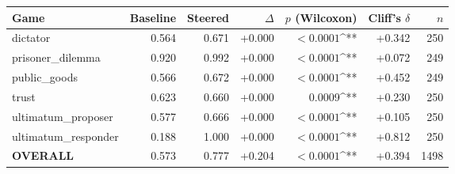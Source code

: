 \begin{tabular}{lrrrrrr}
\toprule
Game & Baseline & Steered & $\Delta$ & $p$ (Wilcoxon) & Cliff's $\delta$ & $n$ \\
\midrule
dictator & 0.564 & 0.671 & +0.000 & $<0.0001$^{**} & +0.342 & 250 \\
prisoner_dilemma & 0.920 & 0.992 & +0.000 & $<0.0001$^{**} & +0.072 & 249 \\
public_goods & 0.566 & 0.672 & +0.000 & $<0.0001$^{**} & +0.452 & 249 \\
trust & 0.623 & 0.660 & +0.000 & 0.0009^{**} & +0.230 & 250 \\
ultimatum_proposer & 0.577 & 0.666 & +0.000 & $<0.0001$^{**} & +0.105 & 250 \\
ultimatum_responder & 0.188 & 1.000 & +0.000 & $<0.0001$^{**} & +0.812 & 250 \\
\textbf{OVERALL} & 0.573 & 0.777 & +0.204 & $<0.0001$^{**} & +0.394 & 1498 \\
\bottomrule
\end{tabular}
